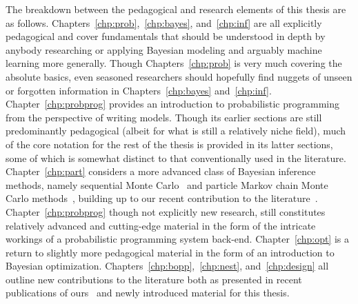 The breakdown between the pedagogical and research elements of this thesis are as follows.
Chapters~\ref{chp:prob},~\ref{chp:bayes}, and~\ref{chp:inf} are all explicitly pedagogical
and cover fundamentals that should be understood in depth by anybody researching or
applying Bayesian modeling and arguably machine learning more generally.  Though
Chapters~\ref{chp:prob} is very much covering the absolute basics,
even seasoned researchers should hopefully find nuggets of unseen or forgotten information 
in Chapters~\ref{chp:bayes} and~\ref{chp:inf}.  Chapter~\ref{chp:probprog} provides an
 introduction to
probabilistic programming from the perspective of writing models.  Though its earlier
sections are still predominantly pedagogical (albeit for what is still a relatively niche field),
much of the core notation for the rest of the thesis is provided in its latter sections, some of
which is somewhat distinct to that conventionally used in the literature.
Chapter~\ref{chp:part} considers a more advanced class of Bayesian inference methods,
namely sequential Monte Carlo~\citep{doucet2009tutorial} and particle Markov chain Monte
Carlo methods~\citep{andrieu2010particle},
building up to our recent contribution to the literature~\citep{rainforth2016interacting}.
Chapter~\ref{chp:probprog} though not explicitly new research, still constitutes
relatively advanced and cutting-edge material in the form of the intricate workings
of a probabilistic programming system back-end.   Chapter~\ref{chp:opt} is a return
to slightly more pedagogical material in the form of an introduction to Bayesian optimization.
Chapters~\ref{chp:bopp},~\ref{chp:nest}, and~\ref{chp:design} all outline new
contributions to the literature both as presented in recent publications of
ours~\citep{rainforth2016bayesian,rainforth2017pitfalls,vincent2017darc} and newly introduced
material for this thesis.
